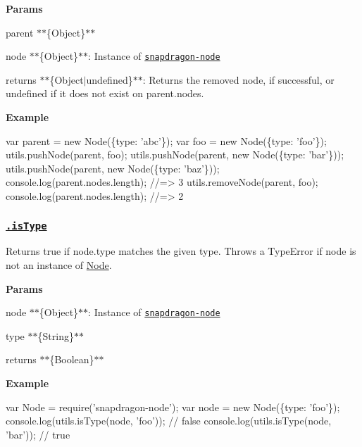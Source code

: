 {\bfseries Params}


\begin{DoxyItemize}
\item {\ttfamily parent} $\ast$$\ast$\{Object\}$\ast$$\ast$
\item {\ttfamily node} $\ast$$\ast$\{Object\}$\ast$$\ast$\+: Instance of \href{https://github.com/jonschlinkert/snapdragon-node}{\tt snapdragon-\/node}
\item {\ttfamily returns} $\ast$$\ast$\{Object$\vert$undefined\}$\ast$$\ast$\+: Returns the removed node, if successful, or undefined if it does not exist on {\ttfamily parent.\+nodes}.
\end{DoxyItemize}

{\bfseries Example}


\begin{DoxyCode}
var parent = new Node(\{type: 'abc'\});
var foo = new Node(\{type: 'foo'\});
utils.pushNode(parent, foo);
utils.pushNode(parent, new Node(\{type: 'bar'\}));
utils.pushNode(parent, new Node(\{type: 'baz'\}));
console.log(parent.nodes.length); //=> 3
utils.removeNode(parent, foo);
console.log(parent.nodes.length); //=> 2
\end{DoxyCode}


\subsubsection*{\href{index.js#L443}{\tt .is\+Type}}

Returns true if {\ttfamily node.\+type} matches the given {\ttfamily type}. Throws a {\ttfamily Type\+Error} if {\ttfamily node} is not an instance of {\ttfamily \mbox{\hyperlink{classNode}{Node}}}.

{\bfseries Params}


\begin{DoxyItemize}
\item {\ttfamily node} $\ast$$\ast$\{Object\}$\ast$$\ast$\+: Instance of \href{https://github.com/jonschlinkert/snapdragon-node}{\tt snapdragon-\/node}
\item {\ttfamily type} $\ast$$\ast$\{String\}$\ast$$\ast$
\item {\ttfamily returns} $\ast$$\ast$\{Boolean\}$\ast$$\ast$
\end{DoxyItemize}

{\bfseries Example}


\begin{DoxyCode}
var Node = require('snapdragon-node');
var node = new Node(\{type: 'foo'\});
console.log(utils.isType(node, 'foo')); // false
console.log(utils.isType(node, 'bar')); // true
\end{DoxyCode}


